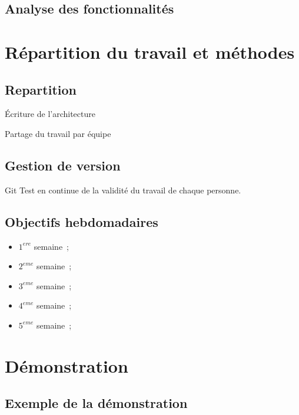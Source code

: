 \documentclass{beamer}
\begin{document}
\subsection{Analyse des fonctionnalités}

\begin{frame}
	
\end{frame}

\section{Répartition du travail et méthodes}

\subsection{Repartition}

\begin{frame}{Écriture de l'architecture}
	
\end{frame}

\begin{frame}{Partage du travail par équipe}
	
\end{frame}

\subsection{Gestion de version}

\begin{frame}{Git}
	Test en continue de la validité du travail de chaque personne.
\end{frame}

\subsection{Objectifs hebdomadaires}

\begin{frame}
	\begin{itemize}
		\item $1^{ere}$ semaine~;
		\item $2^{eme}$ semaine~;
		\item $3^{eme}$ semaine~;
		\item $4^{eme}$ semaine~;
		\item $5^{eme}$ semaine~;
	\end{itemize}

\end{frame}


\section{Démonstration}

\subsection{Exemple de la démonstration}
\end{document}
